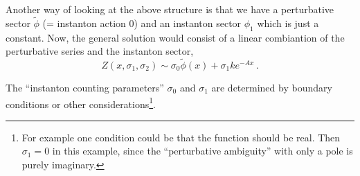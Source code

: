 \documentclass[11pt,a4paper]{scrartcl}
\begin{document}
Another way of looking at the above structure is that we have a perturbative sector $\tilde\phi$ (= instanton action 0)
and an instanton sector $\phi_1$ which is just a constant.
Now, the general solution would consist of a linear combiantion of the perturbative series and the
instanton sector,
\begin{equation}
	Z(x, \sigma_1, \sigma_2) \sim \sigma_0 \tilde\phi(x) + \sigma_1 k e^{-Ax}\,.
\end{equation}

The ``instanton counting parameters'' $\sigma_0$ and $\sigma_1$ are determined by boundary conditions or other
considerations\footnote{For example one condition could be that the function should be real. Then $\sigma_1 = 0$ in
this example, since the ``perturbative ambiguity'' with only a pole is purely imaginary.}.
\end{document}
